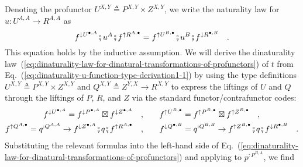 Denoting the profunctor $U^{X,Y}\triangleq P^{X,Y}\times Z^{X,Y}$,
we write the naturality law for $u:U^{A,A}\rightarrow R^{A,A}$ as
\begin{equation}
f^{\downarrow U^{\bullet,A}}\bef u^{A}\bef f^{\uparrow R^{A,\bullet}}=f^{\uparrow U^{B,\bullet}}\bef u^{B}\bef f^{\downarrow R^{\bullet,B}}\quad.\label{eq:dinaturality-u-function-type-derivation1-1}
\end{equation}
This equation holds by the inductive assumption. We will derive the
dinaturality law~(\ref{eq:dinaturality-law-for-dinatural-transformations-of-profunctors})
of $t$ from Eq.~(\ref{eq:dinaturality-u-function-type-derivation1-1})
by using the type definitions $U^{X,Y}\triangleq P^{X,Y}\times Z^{X,Y}$
and $Q^{X,Y}\triangleq Z^{Y,X}\rightarrow R^{X,Y}$ to express the
liftings of $U$ and $Q$ through the liftings of $P$, $R$, and
$Z$ via the standard functor/contrafunctor codes:
\begin{align}
f^{\downarrow U^{\bullet,A}}=f^{\downarrow P^{\bullet,A}}\boxtimes f^{\downarrow Z^{\bullet,A}}\quad, & \quad\quad f^{\uparrow U^{B,\bullet}}=f^{\uparrow P^{B,\bullet}}\boxtimes f^{\uparrow Z^{B,\bullet}}\quad,\label{eq:dinaturality-u-function-type-derivation2-2}\\
f^{\uparrow Q^{A,\bullet}}=q^{:Q^{A,A}}\rightarrow f^{\downarrow Z^{\bullet,A}}\bef q\bef f^{\uparrow R^{A,\bullet}}\quad, & \quad\quad f^{\downarrow Q^{\bullet,B}}=q^{:Q^{B,B}}\rightarrow f^{\uparrow Z^{B,\bullet}}\bef q\bef f^{\downarrow R^{\bullet,B}}\quad.\label{eq:dinaturality-u-function-type-derivation3-2}
\end{align}
Substituting the relevant formulas into the left-hand side of Eq.~(\ref{eq:dinaturality-law-for-dinatural-transformations-of-profunctors})
and applying to $p^{:P^{B,A}}$, we find
